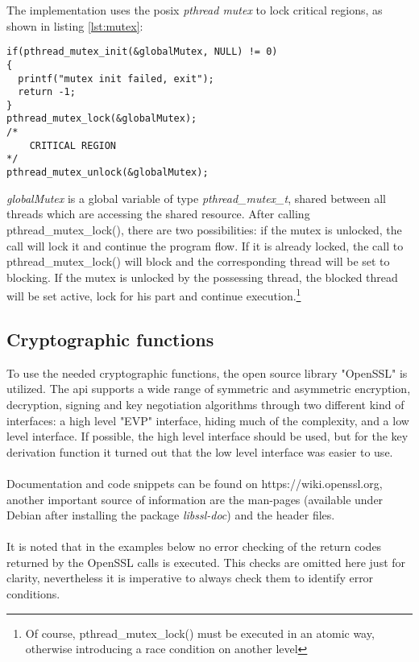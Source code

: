 The implementation uses the \gls{posix} \textit{pthread mutex} to lock critical regions, as shown in listing \ref{lst:mutex}:  
\begin{lstlisting}[style=cStyle,caption={Locking a critical region},label=lst:mutex]
if(pthread_mutex_init(&globalMutex, NULL) != 0)
{
  printf("mutex init failed, exit");
  return -1;
}
pthread_mutex_lock(&globalMutex);
/*
    CRITICAL REGION
*/
pthread_mutex_unlock(&globalMutex);
\end{lstlisting}
\textit{globalMutex} is a global variable of type \textit{pthread\_mutex\_t}, shared between all threads which are accessing the shared resource. After calling pthread\_mutex\_lock(),
there are two possibilities: if the mutex is unlocked, the call will lock it and continue the program flow. If it is already locked, the call to pthread\_mutex\_lock() will block and
the corresponding thread will be set to blocking.
If the mutex is unlocked by the possessing thread, the blocked thread will be set active, lock for his part and continue execution.\footnote{Of course, pthread\_mutex\_lock() must
be executed in an atomic way, otherwise introducing a race condition on another level}

\subsection{Cryptographic functions}
To use the needed cryptographic functions, the open source library "OpenSSL" is utilized. The \gls{api} supports a wide range of symmetric and asymmetric encryption, 
decryption, signing and key negotiation algorithms through two different kind of interfaces: a high level "EVP" interface, hiding much of the complexity, and 
a low level interface. If possible, the high level interface should be used, but for the key derivation function it turned out that the low level interface was easier to use.
\\
\\
Documentation and code snippets can be found on https://wiki.openssl.org, another important source of information are the man-pages (available under Debian after installing the
package \textit{libssl-doc}) and the header files.
\\
\\
It is noted that in the examples below no error checking of the return codes returned by the OpenSSL calls is executed. This checks are omitted here just for clarity, nevertheless it is
imperative to always check them to identify error conditions.

